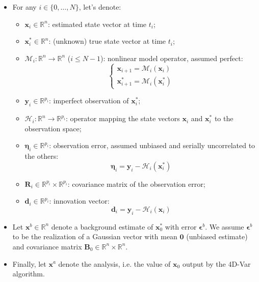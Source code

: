 \documentclass[a4paper,10pt]{article}
\newcommand{\MM}{\mathcal M}
\newcommand{\MH}{\mathcal H}
\newcommand{\BR}{{\mathbf R}}
\newcommand{\BB}{{\mathbf B}}
\newcommand{\bx}{{\boldsymbol x}}
\newcommand{\by}{{\boldsymbol y}}
\newcommand{\bd}{{\boldsymbol d}}
\newcommand{\bet}{{\boldsymbol \eta}}
\newcommand{\bep}{{\boldsymbol \epsilon}}
\newcommand{\mathR}{\mathbb{R}}
\newcommand{\mathRpi}{\mathR^{p_i}}
\newcommand{\izton}{i \in \{0, \dots, N\}}
\begin{document}
\begin{itemize}
	\item For any $\izton$, let's denote:
	\begin{itemize}
		\item $\bx_i \in \mathR^n$: estimated state vector at time $t_i$;
		
		\item $\bx_i^* \in \mathR^n$: (unknown) true state vector at time $t_i$;
		
		\item $\MM_i : \mathR^n \rightarrow \mathR^n$ ($i \leq N-1$): nonlinear model operator, assumed perfect:
		\begin{equation}
		\label{eq:model}
		\begin{cases}
			\bx_{i+1} = \MM_i(\bx_i) \\
			\bx_{i+1}^* = \MM_i(\bx_i^*)
		\end{cases}
		\end{equation}
		
		\item $\by_i \in \mathRpi$: imperfect observation of $\bx_i^*$;
		
		\item $\MH_i: \mathR^n \rightarrow \mathRpi$: operator mapping the state vectors $\bx_i$ and $\bx_i^*$ to the observation space;
		
		\item $\bet_i \in \mathRpi$: observation error, assumed unbiased and serially uncorrelated to the others:
		\begin{equation}
		\label{eq:obs_err}
			\bet_i = \by_i - \MH_i(\bx_i^*)
		\end{equation}
		
		\item $\BR_i \in \mathRpi \times \mathRpi$: covariance matrix of the observation error;
		
		\item $\bd_i \in \mathRpi$: innovation vector:
		\begin{equation}
		\label{eq:innov}
		\bd_i = \by_i - \MH_i(\bx_i)
		\end{equation}
	\end{itemize}

	\item Let $\bx^b \in \mathR^n$ denote a background estimate of $\bx_0^*$ with error $\bep^b$. We assume $\bep^b$ to be the realization of a Gaussian vector with mean $\boldsymbol 0$ (unbiased estimate) and covariance matrix $\BB_0 \in \mathR^n \times \mathR^n$.
	
	\item Finally, let $\bx^a$ denote the analysis, i.e. the value of $\bx_0$ output by the 4D-Var algorithm.
\end{itemize}
\end{document}
